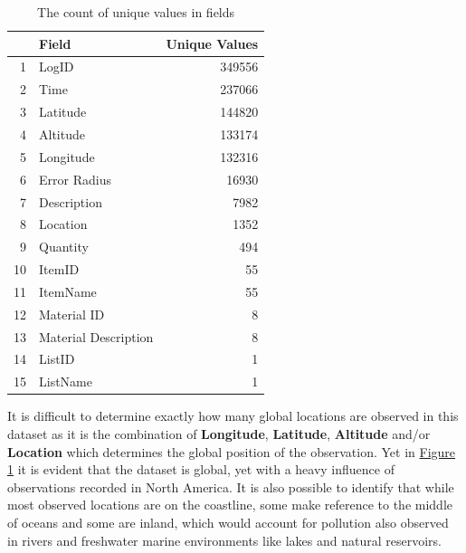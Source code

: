 \documentclass[10pt]{article}\usepackage[]{graphicx}\usepackage[]{color}
\begin{document}
\begin{table}[ht]
\centering
\begin{tabular}{rlr}
  \hline
 & Field & Unique Values \\ 
  \hline
1 & LogID & 349556 \\ 
  2 & Time & 237066 \\ 
  3 & Latitude & 144820 \\ 
  4 & Altitude & 133174 \\ 
  5 & Longitude & 132316 \\ 
  6 & Error Radius & 16930 \\ 
  7 & Description & 7982 \\ 
  8 & Location & 1352 \\ 
  9 & Quantity & 494 \\ 
  10 & ItemID &  55 \\ 
  11 & ItemName &  55 \\ 
  12 & Material ID &   8 \\ 
  13 & Material Description &   8 \\ 
  14 & ListID &   1 \\ 
  15 & ListName &   1 \\ 
   \hline
\end{tabular}
\caption{The count of unique values in fields} 
\label{tab:unique}
\end{table}


It is difficult to determine exactly how many global locations are observed in this dataset as it is the combination of \textbf{Longitude}, \textbf{Latitude}, \textbf{Altitude} and/or \textbf{Location} which determines the global position of the observation. Yet in \hyperref[fig1]{Figure 1} it is evident that the dataset is global, yet with a heavy influence of observations recorded in North America. It is also possible to identify that while most observed locations are on the coastline, some make reference to the middle of oceans and some are inland, which would account for pollution also observed in rivers and freshwater marine environments like lakes and natural reservoirs.
\end{document}
